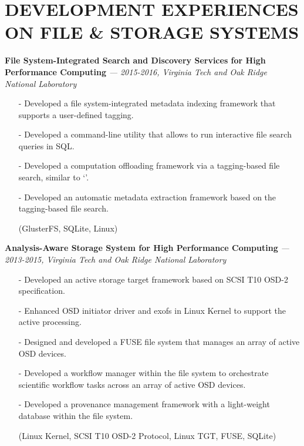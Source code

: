 \section{DEVELOPMENT EXPERIENCES ON FILE \& STORAGE SYSTEMS} 
\vspace{0.03in}
  {\bf File System-Integrated Search and Discovery Services for High Performance Computing}
   {\it \footnotesize --- 2015-2016, Virginia Tech and Oak Ridge National Laboratory}
   \begin{itemize}[leftmargin=*]
    \setlength\itemsep{-0.02in}
    \item[-] Developed a file system-integrated metadata indexing framework
	     that supports a user-defined tagging.
    \item[-] Developed a command-line utility that allows to run interactive file search queries
             in SQL.
    \item[-] Developed a computation offloading framework via a tagging-based file search,
             similar to `'.
    \item[-] Developed an automatic metadata
	     extraction framework based on the tagging-based file search.
    \item[] {\small(GlusterFS, SQLite, Linux)}
   \end{itemize}
  \vspace{-0.15in}
  {\bf Analysis-Aware Storage System for High Performance Computing}
    {\it \footnotesize --- 2013-2015, Virginia Tech and Oak Ridge National Laboratory}
    \begin{itemize}[leftmargin=*]
    \setlength\itemsep{-0.02in}
    \item[-] Developed an active storage target framework based on SCSI T10 OSD-2
    specification.
    \item[-] Enhanced OSD initiator driver and exofs in Linux Kernel to support the active
    processing.
    \item[-] Designed and developed a FUSE file system that manages an array of active OSD devices.
    \item[-] Developed a workflow manager within the file system to orchestrate scientific
    workflow tasks across an array of active OSD devices.
    \item[-] Developed a provenance management framework with a light-weight database
             within the file system.
    \item[] {\small(Linux Kernel, SCSI T10 OSD-2 Protocol, Linux TGT, FUSE, SQLite)}
    \end{itemize}
